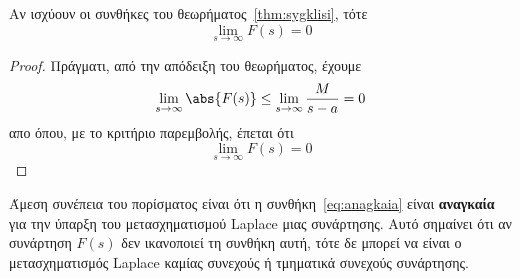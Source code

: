 \begin{cor}
  Αν ισχύουν οι συνθήκες του θεωρήματος~\ref{thm:sygklisi}, τότε
  \begin{equation}\label{eq:anagkaia}
    \lim_{s \to \infty} F(s) = 0 
  \end{equation} 
\end{cor}
\begin{proof}
  Πράγματι, από την απόδειξη του θεωρήματος, έχουμε
  \[
    \lim_{s \to \infty} \abs{F(s)} \leq \lim_{s \to \infty} \frac{M}{s-a} = 0
  \] 
  απο όπου, με το κριτήριο παρεμβολής, έπεται ότι
  \[
    \lim_{s \to \infty} F(s) = 0 
  \]
\end{proof}
\begin{rem}
  Άμεση συνέπεια του πορίσματος είναι ότι η συνθήκη~\eqref{eq:anagkaia} είναι 
  \textbf{αναγκαία} για την ύπαρξη του μετασχηματισμού Laplace μιας συνάρτησης. 
  Αυτό σημαίνει ότι αν συνάρτηση $F(s)$ δεν ικανοποιεί τη συνθήκη αυτή, τότε δε 
  μπορεί να είναι ο μετασχηματισμός Laplace καμίας συνεχούς ή τμηματικά συνεχούς 
  συνάρτησης.
\end{rem}





